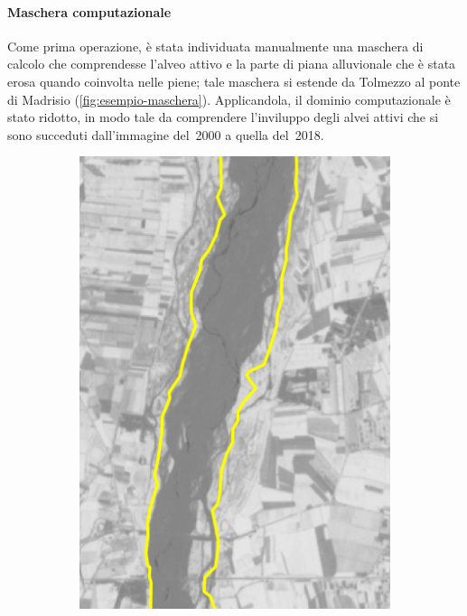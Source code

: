 \paragraph{Maschera computazionale}
Come prima operazione, è stata individuata manualmente una maschera di calcolo che comprendesse l'alveo attivo e la parte di piana alluvionale che è stata erosa quando coinvolta nelle piene; 
tale maschera si estende da Tolmezzo al ponte di Madrisio
(\cref{fig:esempio-maschera}). 
Applicandola, il dominio computazionale è stato ridotto, in modo tale da comprendere l'inviluppo degli alvei attivi che si sono succeduti dall'immagine del~2000 a quella del~2018.
%
\begin{figure}
	\centering
	\begin{subfigure}[b]{0.4\textwidth}
		\includegraphics[width=\textwidth]{files/esempio_mask_2002_06_12.jpeg}

\end{subfigure}
\end{figure}

